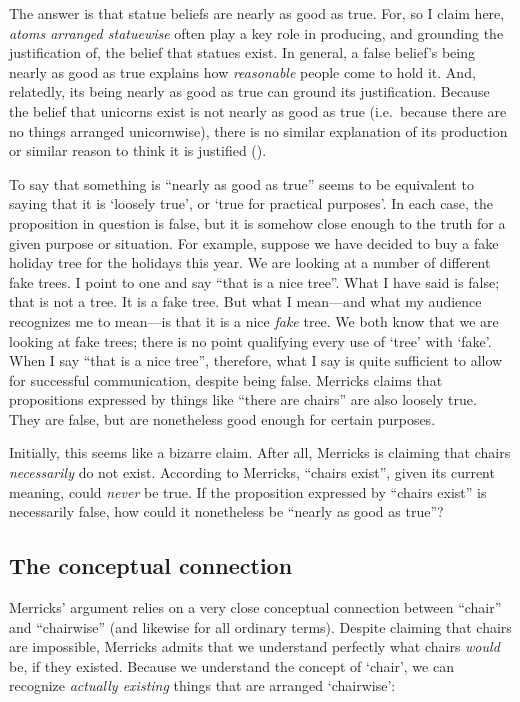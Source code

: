\documentclass[11pt]{article}
\newenvironment{squote}{%
\begin{spacing}{1}
       	\begin{list}{}{%
\setlength{\labelwidth}{0pt}%
\rightmargin\leftmargin%
}
\item\relax
}{%
\end{list}%
\end{spacing}
}
\begin{document}
\begin{spacing}{1.25}
\begin{squote}
The answer is that statue beliefs are nearly as good as true.  For, so
I claim here, {\em atoms arranged statuewise} often play a key role in
producing, and grounding the justification of, the belief that statues
exist.  In general, a false belief's being nearly as good as true
explains how {\em reasonable} people come to hold it.  And, relatedly,
its being nearly as good as true can ground its justification.
Because the belief that unicorns exist is not nearly as good as true
(i.e.\ because there are no things arranged unicornwise), there is no
similar explanation of its production or similar reason to think it is
justified (\citeyear[171--172]{merricks2001a}).
\end{squote}

To say that something is ``nearly as good as true'' seems to be
equivalent to saying that it is `loosely true', or `true for practical
purposes'.  In each case, the proposition in question is false, but it
is somehow close enough to the truth for a given purpose or situation.
For example, suppose we have decided to buy a fake holiday tree for
the holidays this year.  We are looking at a number of different fake
trees.  I point to one and say ``that is a nice tree''.  What I have
said is false; that is not a tree.  It is a fake tree.  But what I
mean---and what my audience recognizes me to mean---is that it is a
nice {\em fake} tree.  We both know that we are looking at fake trees;
there is no point qualifying every use of `tree' with `fake'.  When I
say ``that is a nice tree'', therefore, what I say is quite sufficient
to allow for successful communication, despite being false.  Merricks
claims that propositions expressed by things like ``there are chairs''
are also loosely true.  They are false, but are nonetheless good
enough for certain purposes.

Initially, this seems like a bizarre claim.  After all, Merricks is
claiming that chairs {\em necessarily} do not exist.  According to
Merricks, ``chairs exist'', given its current meaning, could {\em
  never} be true.  If the proposition expressed by ``chairs exist'' is
necessarily false, how could it nonetheless be ``nearly as good as
true''?

\subsection{The conceptual connection}
\label{connection}
Merricks' argument relies on a very close conceptual connection
between ``chair'' and ``chairwise'' (and likewise for all ordinary
terms).  Despite claiming that chairs are impossible, Merricks admits
that we understand perfectly what chairs {\em would} be, if they
existed.  Because we understand the concept of `chair', we can
recognize {\em actually existing} things that are arranged
`chairwise':


\end{spacing}
\end{document}
